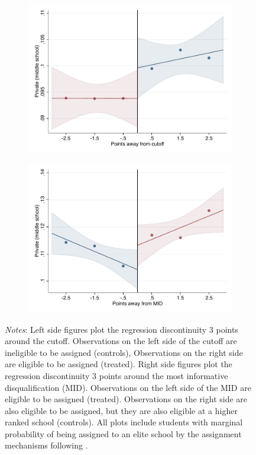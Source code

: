 \documentclass[oneside,11pt]{article}
\begin{document}
\begin{figure}[H]
\begin{center}
    \begin{subfigure}{0.475\textwidth}
        \centering
        \includegraphics[width=\textwidth]{04_Figures/rd_plot_tau_Secundaria_Privada_IPN3.pdf}
    \end{subfigure}
    \begin{subfigure}{0.475\textwidth}
        \centering
        \includegraphics[width=\textwidth]{04_Figures/rd_plot_mid_Secundaria_Privada_IPN3.pdf}
    \end{subfigure}
    \end{center}
    
\footnotesize
\textit{Notes}: Left side figures plot the regression discontinuity 3 points around the cutoff. Observations on the left side of the cutoff are ineligible to be assigned (controls), Observations on the right side are eligible to be assigned (treated). Right side figures plot the regression discontinuity 3 points around the most informative disqualification (MID). Observations on the left side of the MID are eligible to be assigned (treated). Observations on the right side are also eligible to be assigned, but they are also eligible at a higher ranked school (controls). All plots include students with marginal probability of being assigned to an elite school by the assignment mechanisms following \citet{abdulkadirouglu2022breaking}. 
\end{figure}
\end{document}
